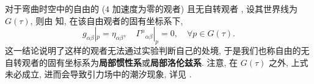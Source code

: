 对于弯曲时空中的自由的 ($4$ 加速度为零的观者) 且无自转观者 , 设其世界线为 $G(\tau)$, 则由 \cite[命题 7-5-1]{梁灿彬2000微分几何入门与广义相对论} 知, 在该自由观者的固有坐标系下,
\[ g_{\alpha\beta}|_p=\eta_{\alpha\beta},\quad \Gamma^{\mu}{}_{\alpha\beta}|_p=0,\quad \forall p\in G(\tau). \] 
这一结论说明了这样的观者无法通过实验判断自己的处境, 于是我们也称自由的无自转观者的固有坐标系为{\bf 局部惯性系}或{\bf 局部洛伦兹系}. 注意, 在 $G(\tau)$ 之外, 上式未必成立, 进而会导致引力场中的潮汐现象, 详见 \cite[\S\,7.6]{梁灿彬2000微分几何入门与广义相对论}.